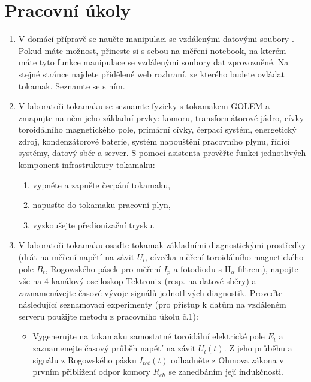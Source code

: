 
\section{Pracovní úkoly}
\begin{enumerate}
    \setlength{\itemsep}{-2pt}
    \item \underline{V domácí přípravě} se naučte manipulaci se vzdálenými datovými soubory  \href{http://golem.fjfi.cvut.cz/wiki/TrainingCourses/KFpract/index}{\cite{gw:KFpraktdopr}}. Pokud máte 
    možnost, přineste si s sebou na měření notebook, na kterém máte tyto funkce manipulace se vzdálenými soubory dat zprovozněné. Na stejné stránce najdete přidělené web rozhraní, ze kterého budete ovládat tokamak. Seznamte se s ním.
    \item \underline{V laboratoři tokamaku} se seznamte fyzicky s tokamakem GOLEM a zmapujte na něm jeho základní prvky: komoru, transformátorové jádro, cívky toroidálního magnetického pole, primární cívky, čerpací systém, energetický zdroj, kondenzátorové baterie, systém napouštění pracovního plynu, řídící systémy, datový sběr a server.
    S pomocí asistenta prověřte funkci jednotlivých komponent infrastruktury tokamaku:
    \vspace{-2mm}
    \begin{enumerate}
	\setlength{\itemsep}{-2pt}
	\item vypněte a zapněte čerpání tokamaku,
	\item napusťte do tokamaku pracovní plyn,
	\item vyzkoušejte předionizační trysku.
	\end{enumerate}
    \item \underline{V laboratoři tokamaku} osaďte tokamak základními diagnostickými prostředky (drát na měření napětí na závit $U_l$, cívečka měření toroidálního magnetického pole $B_t$, Rogowského pásek pro měření $I_p$ a fotodiodu s H$_\alpha$ filtrem), napojte vše na 4-kanálový osciloskop Tektronix (resp. na datové sběry) a zaznamenávejte časové vývoje signálů jednotlivých diagnostik. Proveďte následující seznamovací experimenty (pro přístup k datům na vzdáleném serveru použijte metodu z pracovního úkolu č.1):
    \vspace{-2mm} 
    \begin{itemize}
    \item Vygenerujte na tokamaku samostatné toroidální elektrické pole $E_t$ a  zaznamenejte časový průběh napětí na závit $U_l(t)$. Z jeho průběhu a signálu z Rogowského pásku $I_{tot}(t)$  odhadněte z Ohmova zákona v prvním přiblížení odpor komory $R_{ch}$ se zanedbáním její indukčnosti.

\end{itemize}
\end{enumerate}
